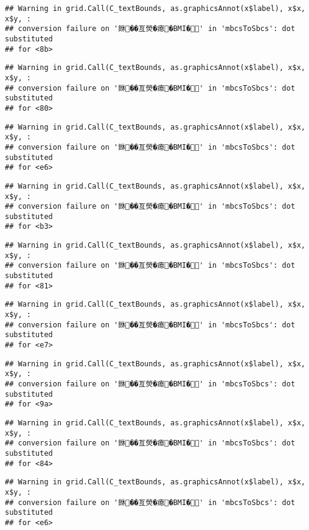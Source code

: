 \documentclass[
]{article}
\begin{document}
\begin{verbatim}
## Warning in grid.Call(C_textBounds, as.graphicsAnnot(x$label), x$x, x$y, :
## conversion failure on '銝��亙熒�瘜�BMI�' in 'mbcsToSbcs': dot substituted
## for <8b>
\end{verbatim}

\begin{verbatim}
## Warning in grid.Call(C_textBounds, as.graphicsAnnot(x$label), x$x, x$y, :
## conversion failure on '銝��亙熒�瘜�BMI�' in 'mbcsToSbcs': dot substituted
## for <80>
\end{verbatim}

\begin{verbatim}
## Warning in grid.Call(C_textBounds, as.graphicsAnnot(x$label), x$x, x$y, :
## conversion failure on '銝��亙熒�瘜�BMI�' in 'mbcsToSbcs': dot substituted
## for <e6>
\end{verbatim}

\begin{verbatim}
## Warning in grid.Call(C_textBounds, as.graphicsAnnot(x$label), x$x, x$y, :
## conversion failure on '銝��亙熒�瘜�BMI�' in 'mbcsToSbcs': dot substituted
## for <b3>
\end{verbatim}

\begin{verbatim}
## Warning in grid.Call(C_textBounds, as.graphicsAnnot(x$label), x$x, x$y, :
## conversion failure on '銝��亙熒�瘜�BMI�' in 'mbcsToSbcs': dot substituted
## for <81>
\end{verbatim}

\begin{verbatim}
## Warning in grid.Call(C_textBounds, as.graphicsAnnot(x$label), x$x, x$y, :
## conversion failure on '銝��亙熒�瘜�BMI�' in 'mbcsToSbcs': dot substituted
## for <e7>
\end{verbatim}

\begin{verbatim}
## Warning in grid.Call(C_textBounds, as.graphicsAnnot(x$label), x$x, x$y, :
## conversion failure on '銝��亙熒�瘜�BMI�' in 'mbcsToSbcs': dot substituted
## for <9a>
\end{verbatim}

\begin{verbatim}
## Warning in grid.Call(C_textBounds, as.graphicsAnnot(x$label), x$x, x$y, :
## conversion failure on '銝��亙熒�瘜�BMI�' in 'mbcsToSbcs': dot substituted
## for <84>
\end{verbatim}

\begin{verbatim}
## Warning in grid.Call(C_textBounds, as.graphicsAnnot(x$label), x$x, x$y, :
## conversion failure on '銝��亙熒�瘜�BMI�' in 'mbcsToSbcs': dot substituted
## for <e6>
\end{verbatim}
\end{document}
